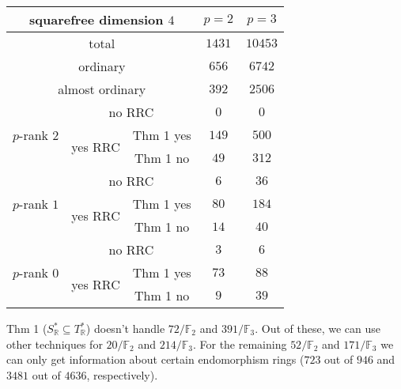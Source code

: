 \documentclass[usenames,dvipsnames]{beamer}
\def\R{\mathbb{R}}
\def\F{\mathbb{F}}
\begin{document}
\begin{frame}{ }{}
\begin{table}[ht]
    \centering
\footnotesize	
    \begin{tabular}{|c|c|c|c|c|}\hline
\multicolumn{3}{|c|}{squarefree dimension $4$}                  & $p=2$ & $p=3$ \\\hline
\multicolumn{3}{|c|}{total}                                     & $1431$ & $10453$  \\\hline                    
\multicolumn{3}{|c|}{ordinary}                                  & $656$ & $6742$  \\\hline
\multicolumn{3}{|c|}{almost ordinary}                           & $392$ & $2506$  \\\hline
\multirow{3}{*}{$p$-rank $2$} & \multicolumn{2}{|c|}{no RRC}    & $0$ & $0$ \\\cline{2-5}
                              & \multirow{2}{*}{yes RRC} & Thm 1 yes & $149$ & $500$   \\\cline{3-5}
                              &                          & Thm 1 no  & $49$ & $312$   \\\hline
\multirow{3}{*}{$p$-rank $1$} & \multicolumn{2}{|c|}{no RRC}    & $6$ & $36$ \\\cline{2-5}
                              & \multirow{2}{*}{yes RRC} & Thm 1 yes & $80$ & $184$   \\\cline{3-5}
                              &                          & Thm 1 no  & $14$ & $40$   \\\hline
\multirow{3}{*}{$p$-rank $0$} & \multicolumn{2}{|c|}{no RRC}    & $3$ & $6$   \\\cline{2-5}
                              & \multirow{2}{*}{yes RRC} & Thm 1 yes & $73$ & $88$ \\\cline{3-5}
                              &                          & Thm 1 no  & $9$ & $39$ \\\hline                              
    \end{tabular}
    \label{tab:dim4}
\end{table}
\pause
{\small
	Thm 1 ($S^*_\R\subseteq T^*_\R$) doesn't handle $72/\F_2$ and $391/\F_3$.
\pause	
	Out of these, we can use other techniques for $20/\F_2$ and $214/\F_3$.
\pause
	For the remaining $52/\F_2$ and $171/\F_3$ we can only get information about certain endomorphism rings ($723$ out of $946$ and $3481$ out of $4636$, respectively).
}
\end{frame}
\end{document}
